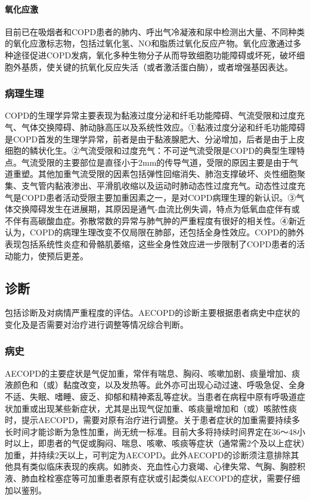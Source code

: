 \paragraph{氧化应激}

目前已在吸烟者和COPD患者的肺内、呼出气冷凝液和尿中检测出大量、不同种类的氧化应激标志物，包括过氧化氢、NO和脂质过氧化反应产物。氧化应激通过多种途径促进COPD发病，氧化多种生物分子从而导致细胞功能障碍或坏死，破坏细胞外基质，使关键的抗氧化反应失活（或者激活蛋白酶），或者增强基因表达。

\subsubsection{病理生理}

COPD的生理学异常主要表现为黏液过度分泌和纤毛功能障碍、气流受限和过度充气、气体交换障碍、肺动脉高压以及系统性效应。①黏液过度分泌和纤毛功能障碍是COPD首发的生理学异常，前者是由于黏液腺肥大、分泌增加，后者是由于上皮细胞的鳞状化生。②气流受限和过度充气：不可逆气流受限是COPD的典型生理特点。气流受限的主要部位是直径小于2mm的传导气道，受限的原因主要是由于气道重塑。其他加重气流受限的因素包括弹性回缩消失、肺泡支撑破坏、炎性细胞聚集、支气管内黏液渗出、平滑肌收缩以及运动时肺动态性过度充气。动态性过度充气是COPD患者活动受限主要加重因素之一，是对COPD病理生理的新认识。③气体交换障碍发生在进展期，其原因是通气-血流比例失调，特点为低氧血症伴有或不伴有高碳酸血症。弥散常数的异常与肺气肿的严重程度有很好的相关性。④新近认为，COPD的病理生理改变不仅局限在肺部，还包括全身性效应。COPD的肺外表现包括系统性炎症和骨骼肌萎缩，这些全身性效应进一步限制了COPD患者的活动能力，使预后更差。

\subsection{诊断}

包括诊断及对病情严重程度的评估。AECOPD的诊断主要根据患者病史中症状的变化及是否需要对治疗进行调整等情况综合判断。

\subsubsection{病史}

AECOPD的主要症状是气促加重，常伴有喘息、胸闷、咳嗽加剧、痰量增加、痰液颜色和（或）黏度改变，以及发热等。此外亦可出现心动过速、呼吸急促、全身不适、失眠、嗜睡、疲乏、抑郁和精神紊乱等症状。当患者在病程中原有呼吸道症状加重或出现某些新症状，尤其是出现气促加重、咳痰量增加和（或）咳脓性痰时，提示AECOPD，需要对原有治疗进行调整。关于患者症状的加重需要持续多长时间才能诊断为急性加重，尚无统一标准。目前大多将持续时间界定在36～48小时以上，即患者的气促或胸闷、喘息、咳嗽、咳痰等症状（通常需2个及以上症状）加重，并持续2天以上，可判定为AECOPD。此外AECOPD的诊断须注意排除其他具有类似临床表现的疾病。如肺炎、充血性心力衰竭、心律失常、气胸、胸腔积液、肺血栓栓塞症等可加重患者原有症状或引起类似AECOPD的症状，需要仔细加以鉴别。

